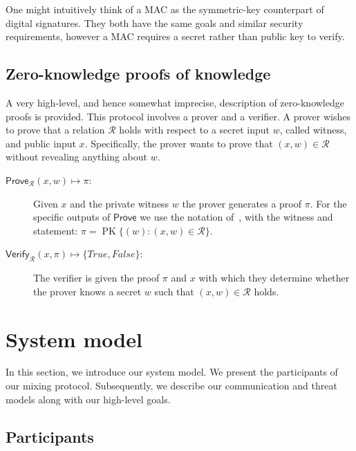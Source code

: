 \documentclass[a4paper]{article}
\begin{document}
One might intuitively think of a MAC as the symmetric-key counterpart of digital signatures. They both have the same goals and similar security requirements, however a MAC requires a secret rather than public key to verify.

\subsection{Zero-knowledge proofs of knowledge}
A very high-level, and hence somewhat imprecise, description of zero-knowledge proofs is provided. This protocol involves a prover and a verifier. A prover wishes to prove that a relation $\mathcal{R}$ holds with respect to a secret input $w$, called witness, and public input $x$. Specifically, the prover wants to prove that $(x, w) \in \mathcal{R}$ without revealing anything about $w$.

\begin{description}
\item[$\mathsf{Prove}_{\mathcal{R}}(x,w)\mapsto{}\pi$:] Given $x$ and the private witness $w$ the prover generates a proof $\pi$. For the specific outputs of $\mathsf{Prove}$ we use the notation of~\cite{camenisch1997proof}, with the witness and statement: $\pi = \operatorname{PK}\{ (w) : (x, w) \in \mathcal{R} \}$.

\item[$\mathsf{Verify}_{\mathcal{R}}(x,\pi)\mapsto{}\{\mathit{True},\mathit{False}\}$:] The verifier is given the proof $\pi$ and $x$ with which they determine whether the prover knows a secret $w$ such that $(x,w) \in \mathcal{R}$ holds.
\end{description}

\section{System model} \label{sec:systemmodel}

In this section, we introduce our system model. We present the participants of our mixing protocol. Subsequently, we describe our communication and threat models along with our high-level goals.
\subsection{Participants} \label{sec:participants}
\end{document}
